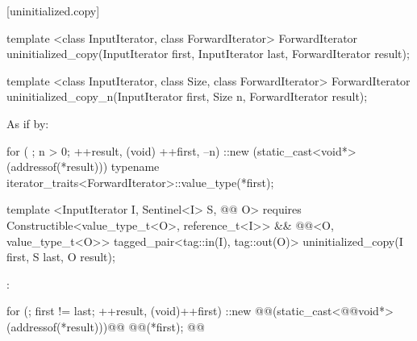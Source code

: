 [uninitialized.copy]{}
{\color{remclr}
\begin{codeblock}
template <class InputIterator, class ForwardIterator>
  ForwardIterator uninitialized_copy(InputIterator first, InputIterator last,
                                     ForwardIterator result);
\end{codeblock}

\setcounter{Paras}{1}
\pnum
\returns {}
\begin{codeblock}
template <class InputIterator, class Size, class ForwardIterator>
  ForwardIterator uninitialized_copy_n(InputIterator first, Size n,
                                       ForwardIterator result);
\end{codeblock}

\pnum
\effects As if by:
\begin{codeblock}
        for ( ; n > 0; ++result, (void) ++first, --n) {
          ::new (static_cast<void*>(addressof(*result)))
            typename iterator_traits<ForwardIterator>::value_type(*first);
        }
\end{codeblock}

\pnum
\returns {}
} %

{\color{addclr}
\begin{codeblock}
template <InputIterator I, Sentinel<I> S, @@ O>
requires
  Constructible<value_type_t<O>, reference_t<I>> &&
  @@<O, value_type_t<O>>
tagged_pair<tag::in(I), tag::out(O)> uninitialized_copy(I first, S last, O result);
\end{codeblock}
} %

\setcounter{Paras}{0}
\pnum
\effects {}:
\begin{codeblock}
    for (; first != last; ++result, (void)++first)
      ::new @@(static_cast<@@void*>(addressof(*result)))@\added{)}@
        @@(*first);
    @@
\end{codeblock}


